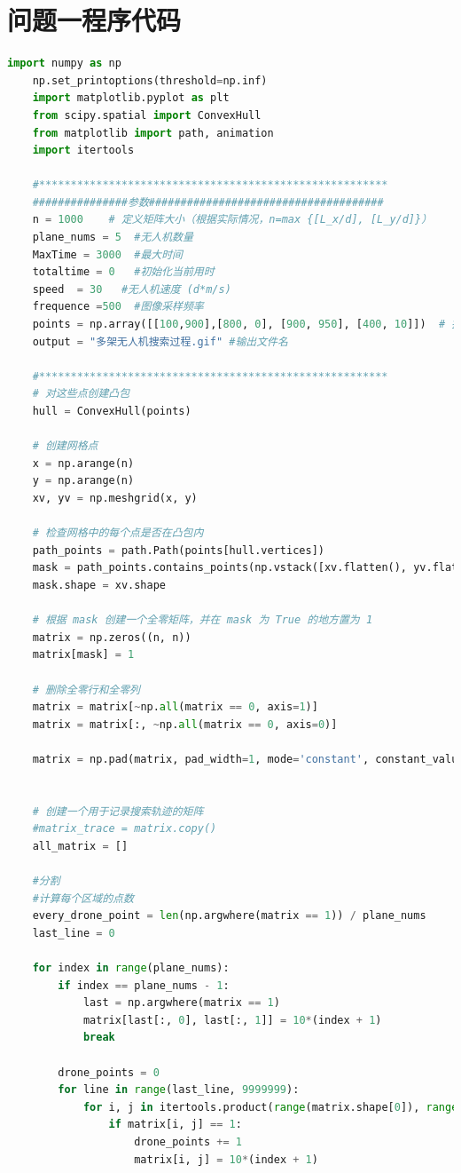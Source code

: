 \documentclass[bwprint]{gmcmthesis}
\numberwithin{figure}{section}
\begin{document}
\section{问题一程序代码}
\begin{lstlisting}[language=Python] 
	import numpy as np
	np.set_printoptions(threshold=np.inf)
	import matplotlib.pyplot as plt
	from scipy.spatial import ConvexHull
	from matplotlib import path, animation
	import itertools
	
	#*******************************************************
	###############参数#####################################
	n = 1000    # 定义矩阵大小（根据实际情况，n=max {[L_x/d], [L_y/d]}）
	plane_nums = 5  #无人机数量
	MaxTime = 3000  #最大时间
	totaltime = 0   #初始化当前用时
	speed  = 30   #无人机速度 (d*m/s)
	frequence =500  #图像采样频率
	points = np.array([[100,900],[800, 0], [900, 950], [400, 10]])  # 指定区域边界
	output = "多架无人机搜索过程.gif" #输出文件名
	
	#*******************************************************
	# 对这些点创建凸包
	hull = ConvexHull(points)
	
	# 创建网格点
	x = np.arange(n)
	y = np.arange(n)
	xv, yv = np.meshgrid(x, y)
	
	# 检查网格中的每个点是否在凸包内
	path_points = path.Path(points[hull.vertices])
	mask = path_points.contains_points(np.vstack([xv.flatten(), yv.flatten()]).T)
	mask.shape = xv.shape
	
	# 根据 mask 创建一个全零矩阵，并在 mask 为 True 的地方置为 1
	matrix = np.zeros((n, n))
	matrix[mask] = 1
	
	# 删除全零行和全零列
	matrix = matrix[~np.all(matrix == 0, axis=1)]
	matrix = matrix[:, ~np.all(matrix == 0, axis=0)]
	
	matrix = np.pad(matrix, pad_width=1, mode='constant', constant_values=0)
	
	
	# 创建一个用于记录搜索轨迹的矩阵
	#matrix_trace = matrix.copy()
	all_matrix = []
	
	#分割
	#计算每个区域的点数
	every_drone_point = len(np.argwhere(matrix == 1)) / plane_nums
	last_line = 0
	
	for index in range(plane_nums):
		if index == plane_nums - 1:
			last = np.argwhere(matrix == 1)
			matrix[last[:, 0], last[:, 1]] = 10*(index + 1)
			break
	
		drone_points = 0
		for line in range(last_line, 9999999):
			for i, j in itertools.product(range(matrix.shape[0]), range(min(line, matrix.shape[1]))):
				if matrix[i, j] == 1:
					drone_points += 1
					matrix[i, j] = 10*(index + 1)
	

\end{lstlisting}
\end{document}
